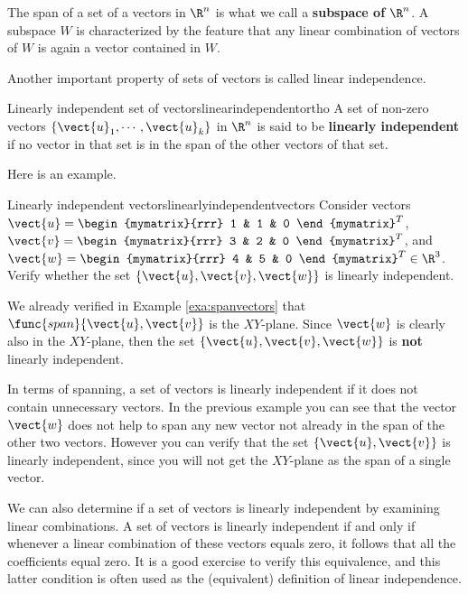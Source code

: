 The span of a set of a vectors in $\R^n$ is what we call a \textbf{subspace of $\R^n$}. A subspace $W$ is characterized by the feature that any linear combination of vectors of $W$ is again a vector contained in $W$. 

Another important property of sets of vectors is called linear independence. 

\begin{definition}{Linearly independent set of vectors}{linearindependentortho}
A set of non-zero vectors $\{\vect{u}_1, \cdots ,\vect{u}_k\}$ in $\R^{n}$ is said to be 
\textbf{linearly independent}
 if no vector in that set is in the span of the other vectors of that set.
\end{definition}

Here is an example.  

\begin{example}{Linearly independent vectors}{linearlyindependentvectors}
Consider vectors $\vect{u}=\begin{mymatrix}{rrr}
1  & 1 & 0
\end{mymatrix}^T$, 
$\vect{v}=\begin{mymatrix}{rrr}
3  & 2 & 0
\end{mymatrix}^T$, and
$\vect{w}=\begin{mymatrix}{rrr}
4  & 5 & 0
\end{mymatrix}^T  \in \R^{3}$.
Verify whether the set $\{\vect{u}, \vect{v}, \vect{w}\}$ is linearly independent. 
\end{example}

\begin{solution}
We already verified in Example \ref{exa:spanvectors} that
$\func{span} \{\vect{u}, \vect{v}\}$ is the $XY$-plane. Since $\vect{w}$
is clearly also in the $XY$-plane, then the set $\{\vect{u}, \vect{v},
\vect{w}\}$ is \textbf{not} linearly independent.
\end{solution}

In terms of spanning, a set of vectors is linearly independent if it
does not contain unnecessary vectors. In the previous example you
can see that the vector $\vect{w}$ does not help to span any new vector
not already in the span of the other two vectors. However you can
verify that the set $\{\vect{u}, \vect{v}\}$ is linearly independent,
since you will not get the $XY$-plane as the span of a single vector.

We can also determine if a set of vectors is linearly independent by examining linear combinations. A set of vectors is linearly independent if and only if
whenever a linear combination of these vectors equals zero, it follows
that all the coefficients equal zero. It is a good exercise to verify
this equivalence, and this latter condition is often used as the
(equivalent) definition of linear independence.

